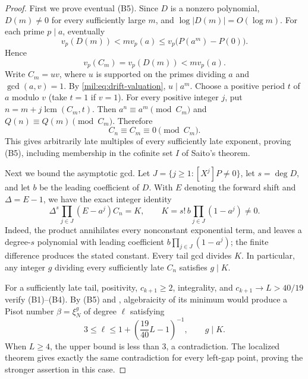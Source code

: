 \documentclass[11pt,a4paper]{article}
\theoremstyle{definition}
\theoremstyle{remark}
\numberwithin{equation}{section}
\begin{document}
\begin{proof}
First we prove eventual (B5). Since $D$ is a nonzero polynomial,
$D(m)\ne0$ for every sufficiently large $m$, and
$\log|D(m)|=O(\log m)$. For each prime $p\mid a$, eventually
\[
 v_p(D(m))<m v_p(a)\le v_p\bigl(P(a^m)-P(0)\bigr).
\]
Hence
\begin{equation}\label{mil:eq:drift-valuation}
 v_p(C_m)=v_p(D(m))<m v_p(a).
\end{equation}
Write $C_m=uv$, where $u$ is supported on the primes dividing $a$
and $\gcd(a,v)=1$. By \eqref{mil:eq:drift-valuation}, $u\mid a^m$.
Choose a positive period $t$ of $a$ modulo $v$ (take $t=1$ if $v=1$).
For every positive integer $j$, put $n=m+j\operatorname{lcm}(C_m,t)$.
Then $a^n\equiv a^m\pmod{C_m}$ and $Q(n)\equiv Q(m)\pmod{C_m}$.
Therefore
\[
 C_n\equiv C_m\equiv0\pmod{C_m}.
\]
This gives arbitrarily late multiples of every sufficiently late
exponent, proving (B5), including membership in the cofinite set $I$
of Saito's theorem.

Next we bound the asymptotic gcd. Let
$J=\{j\ge1:[X^j]P\ne0\}$, let $s=\deg D$, and let $b$ be the
leading coefficient of $D$. With $E$ denoting the forward shift and
$\Delta=E-1$, we have the exact integer identity
\begin{equation}\label{mil:eq:drift-constant}
 \Delta^s\prod_{j\in J}(E-a^j)C_n
   =K,\qquad K=s!\,b\prod_{j\in J}(1-a^j)\ne0.
\end{equation}
Indeed, the product annihilates every nonconstant exponential term,
and leaves a degree-$s$ polynomial with leading coefficient
$b\prod_{j\in J}(1-a^j)$; the finite difference produces the stated
constant. Every tail gcd divides $K$. In particular, any integer $g$
dividing every sufficiently late $C_n$ satisfies $g\mid K$.

For a sufficiently late tail, positivity, $c_{k+1}\ge2$, integrality,
and $c_{k+1}\to L>40/19$ verify (B1)--(B4). By (B5) and
\cite[Theorem~2.3]{SaitoVariants}, algebraicity of its minimum would
produce a Pisot number $\beta=\xi_N^g$ of degree $\ell$ satisfying
\begin{equation}\label{mil:eq:drift-degree}
 3\le\ell\le1+\left(\frac{19}{40}L-1\right)^{-1},
 \qquad g\mid K.
\end{equation}
When $L\ge4$, the upper bound is less than $3$, a contradiction.
The localized theorem gives exactly the same contradiction for every
left-gap point, proving the stronger assertion in this case.


\end{proof}
\end{document}

